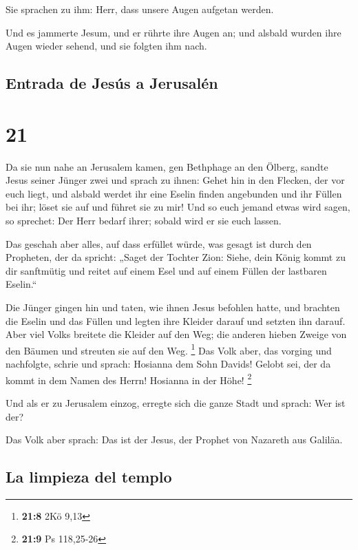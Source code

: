  Sie sprachen zu ihm: Herr, dass unsere Augen aufgetan
werden.

 Und es jammerte Jesum, und er rührte ihre Augen an; und
alsbald wurden ihre Augen wieder sehend, und sie folgten ihm nach.

\hypertarget{entrada-de-jesuxfas-a-jerusaluxe9n}{%
\subsection{Entrada de Jesús a
Jerusalén}\label{entrada-de-jesuxfas-a-jerusaluxe9n}}

\hypertarget{section-20}{%
\section{21}\label{section-20}}

 Da sie nun nahe an Jerusalem kamen, gen Bethphage an den
Ölberg, sandte Jesus seiner Jünger zwei  und sprach zu
ihnen: Gehet hin in den Flecken, der vor euch liegt, und alsbald werdet
ihr eine Eselin finden angebunden und ihr Füllen bei ihr; löset sie auf
und führet sie zu mir!  Und so euch jemand etwas wird
sagen, so sprechet: Der Herr bedarf ihrer; sobald wird er sie euch
lassen.

 Das geschah aber alles, auf dass erfüllet würde, was
gesagt ist durch den Propheten, der da spricht:  „Saget
der Tochter Zion: Siehe, dein König kommt zu dir sanftmütig und reitet
auf einem Esel und auf einem Füllen der lastbaren Eselin.``

 Die Jünger gingen hin und taten, wie ihnen Jesus befohlen
hatte,  und brachten die Eselin und das Füllen und legten
ihre Kleider darauf und setzten ihn darauf.  Aber viel
Volks breitete die Kleider auf den Weg; die anderen hieben Zweige von
den Bäumen und streuten sie auf den Weg. \footnote{\textbf{21:8} 2Kö
  9,13}  Das Volk aber, das vorging und nachfolgte, schrie
und sprach: Hosianna dem Sohn Davids! Gelobt sei, der da kommt in dem
Namen des Herrn! Hosianna in der Höhe! \footnote{\textbf{21:9} Ps
  118,25-26}

 Und als er zu Jerusalem einzog, erregte sich die ganze
Stadt und sprach: Wer ist der?

 Das Volk aber sprach: Das ist der Jesus, der Prophet von
Nazareth aus Galiläa.

\hypertarget{la-limpieza-del-templo}{%
\subsection{La limpieza del templo}\label{la-limpieza-del-templo}}

